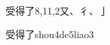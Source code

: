 \begin{entry}{受得了}{8,11,2}{⼜、⼻、⼅}
  \begin{phonetics}{受得了}{shou4de5liao3}
  \end{phonetics}
\end{entry}
